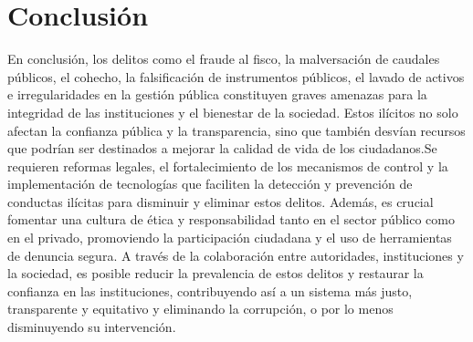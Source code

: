 \documentclass[letter,12pt]{article}
\begin{document}
	\section*{Conclusión}
	En conclusión, los delitos como el fraude al fisco, la malversación de caudales públicos, el cohecho, la falsificación de instrumentos públicos, el lavado de activos e irregularidades en la gestión pública constituyen graves amenazas para la integridad de las instituciones y el bienestar de la sociedad. Estos ilícitos no solo afectan la confianza pública y la transparencia, sino que también desvían recursos que podrían ser destinados a mejorar la calidad de vida de los ciudadanos.Se requieren reformas legales, el fortalecimiento de los mecanismos de control y la implementación de tecnologías que faciliten la detección y prevención de conductas ilícitas para disminuir y eliminar estos delitos. Además, es crucial fomentar una cultura de ética y responsabilidad tanto en el sector público como en el privado, promoviendo la participación ciudadana y el uso de herramientas de denuncia segura. A través de la colaboración entre autoridades, instituciones y la sociedad, es posible reducir la prevalencia de estos delitos y restaurar la confianza en las instituciones, contribuyendo así a un sistema más justo, transparente y equitativo y eliminando la corrupción, o por lo menos disminuyendo su intervención.
	\newpage
	\printbibliography[heading=bibintoc, title=Referencias]
	
\end{document}
